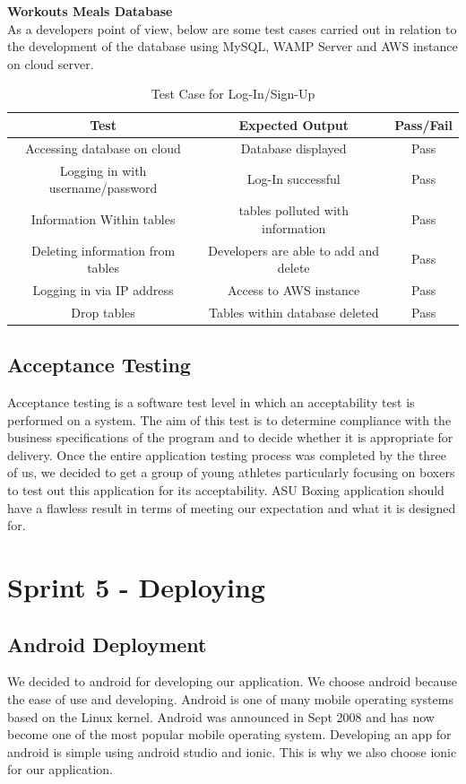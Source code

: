 \documentclass[a4paper,12pt]{report}
\begin{document}
\textbf{Workouts Meals Database}\\
As a developers point of view, below are some test cases carried out in relation to the development of the database using MySQL, WAMP Server and AWS instance on cloud server.

\begin{table}[h]
    \centering
    \begin{tabular}{||c c c||} 
     \hline
     \textbf{Test} & \textbf{Expected Output} & \textbf{Pass/Fail} \\ [0.5ex] 
     \hline\hline
     Accessing database on cloud  & Database displayed & Pass \\ 
     \hline
     Logging in with username/password & Log-In successful & Pass \\  
     \hline
     Information Within tables & tables polluted with information & Pass \\
     \hline
     Deleting information from tables & Developers are able to add and delete  & Pass \\
     \hline
     Logging in via IP address & Access to AWS instance & Pass \\
     \hline
     Drop tables & Tables within database deleted & Pass \\
     \hline
    \end{tabular}
    \caption{Test Case for Log-In/Sign-Up}
    \label{tab:LogInTest}
\end{table}

\subsection{Acceptance Testing}
Acceptance testing is a software test level in which an acceptability test is performed on a system. The aim of this test is to determine compliance with the business specifications of the program and to decide whether it is appropriate for delivery. Once the entire application testing process was completed by the three of us, we decided to get a group of young athletes particularly focusing on boxers to test out this application for its acceptability. ASU Boxing application should have a flawless result in terms of meeting our expectation and what it is designed for.

\section{Sprint 5 - Deploying}
\subsection{Android Deployment}
We decided to android for developing our application. We choose android because the ease of use and developing. Android is one of many mobile operating systems based on the Linux kernel. Android was announced in Sept 2008 and has now become one of the most popular mobile operating system. Developing an app for android is simple using android studio and ionic. This is why we also choose ionic for our application. 
\end{document}
